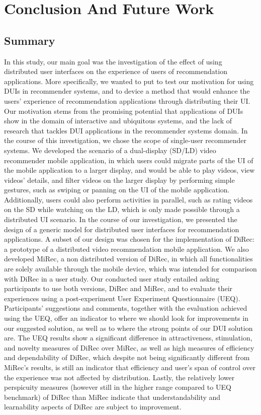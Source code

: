 \chapter{Conclusion And Future Work}\label{chapter:conc}
\section{Summary}
In this study, our main goal was the investigation of the effect of using
distributed user interfaces on the experience of users of recommendation
applications. More specifically, we wanted to put to test our motivation for
using DUIs in recommender systems, and to device a method that would enhance the
users' experience of recommendation applications through distributing their UI.
Our motivation stems from the promising potential that applications of DUIs show in the domain of interactive and
ubiquitous systems, and the lack of research that tackles DUI applications in
the recommender systems domain. In the course of this investigation, we chose
the scope of single-user recommender systems.  We developed the scenario of a
dual-display (SD/LD) video recommender mobile application, in which users could
migrate parts of the UI of the mobile application to a larger display, and would
be able to play videos, view videos' details, and filter videos on the larger
display by performing simple gestures, such as swiping or panning on the UI of
the mobile application. Additionally, users could also perform activities in
parallel, such as rating videos on the SD while watching on the LD, which is
only made possible through a distributed UI scenario. In the course of our
investigation, we presented the design of a generic model for distributed user interfaces for recommendation applications. A subset of our design was chosen for the implementation of DiRec:
a prototype of a distributed video recommendation mobile application.
We also developed MiRec, a non distributed version of DiRec, in which all
functionalities are solely available through the mobile device, which was
intended for comparison with DiRec in a user study.
Our conducted user study entailed asking participants to use both versions, DiRec and MiRec, and to evaluate their experiences using a post-experiment User Experiment Questionnaire (UEQ). Participants' suggestions
and comments, together with the evaluation achieved using the UEQ, offer an
indicator to where we should look for improvements in our suggested solution, as
well as to where the strong points of our DUI solution are. The UEQ results show
a significant difference in attractiveness, stimulation, and novelty measures of
DiRec over MiRec, as well as high measures of efficiency and dependability of
DiRec, which despite not being significantly different from MiRec's results, is
still an indicator that efficiency and user's span of control over the
experience was not affected by distribution. Lastly, the relatively lower perspicuity
measures (however still in the higher range compared to UEQ benchmark) of DiRec
than MiRec indicate that understandability and learnability aspects of DiRec are
subject to improvement.
